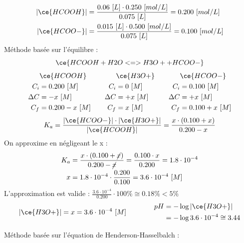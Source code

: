 \documentclass[
  11pt,
  french,
  a4paper,
  openany]{book}
\begin{document}
\begin{Answer}
\[
\begin{split}
  |\ce{HCOOH}| &= \frac{0.06\ [L] \cdot 0.250\ [mol/L]}{0.075\ [L]} = 0.200\ [mol/L] \\
  |\ce{HCOO-}| &= \frac{0.015\ [L] \cdot 0.500\ [mol/L]}{0.075\ [L]} = 0.100\ [mol/L]
\end{split}
\]
Méthode basée sur l'équilibre :
\[
\ce{HCOOH + H2O <=> H3O+ + HCOO-}
\]
\[
\begin{split}
&\ce{HCOOH}\\
C_i &= 0.200\ [M] \\
\Delta C &= - x\ [M] \\
C_f &= 0.200 - x\ [M] \\
\end{split}
\qquad
\begin{split}
&\ce{H3O+}\\
C_i &= 0\ [M] \\
\Delta C &= + x\ [M] \\
C_f &= x\ [M] \\
\end{split}
\qquad
\begin{split}
&\ce{HCOO-}\\
C_i &= 0.100\ [M] \\
\Delta C &= + x\ [M] \\
C_f &= 0.100 + x\ [M] \\
\end{split}
\]
\[
K_a = \frac{|\ce{HCOO-}| \cdot |\ce{H3O+}|}{|\ce{HCOOH}|} = \frac{x \cdot (0.100 + x)}{0.200 - x}
\]
On approxime en négligeant le x :
\[
\begin{split}
K_a &= \frac{x \cdot (0.100 + \cancel{x})}{0.200 - \cancel{x}} = \frac{0.100 \cdot x}{0.200} = 1.8 \cdot 10^{-4} \\
x &= 1.8 \cdot 10^{-4} \cdot \frac{0.200}{0.100} = 3.6 \cdot 10^{-4}\ [M]
\end{split}
\]
L'approximation est valide : \(\frac{3.6 \cdot 10^{-4}}{0.200} \cdot 100\% \cong 0.18\% < 5\%\)
\[
\begin{split}
|\ce{H3O+}| = x = 3.6 \cdot 10^{-4}\ [M]
\end{split}
\qquad\qquad
\begin{split}
pH &= - \log |\ce{H3O+}| \\
 &= - \log 3.6 \cdot 10^{-4} \cong 3.44
\end{split}
\]

Méthode basée sur l'équation de Henderson-Hasselbalch :


\end{Answer}
\end{document}

